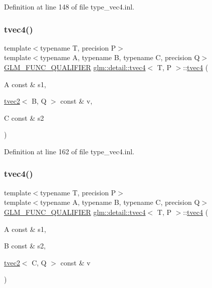 Definition at line 148 of file type\+\_\+vec4.\+inl.

\mbox{\label{structglm_1_1detail_1_1tvec4_ad501d232fe0d59f7734803371445a9cd}} 
\subsubsection{\texorpdfstring{tvec4()}{tvec4()}\hspace{0.1cm}{\footnotesize\ttfamily [19/23]}}
{\footnotesize\ttfamily template$<$typename T, precision P$>$ \\
template$<$typename A, typename B, typename C, precision Q$>$ \\
\hyperlink{setup_8hpp_a33fdea6f91c5f834105f7415e2a64407}{G\+L\+M\+\_\+\+F\+U\+N\+C\+\_\+\+Q\+U\+A\+L\+I\+F\+I\+ER} \hyperlink{structglm_1_1detail_1_1tvec4}{glm\+::detail\+::tvec4}$<$ T, P $>$\+::\hyperlink{structglm_1_1detail_1_1tvec4}{tvec4} (\begin{DoxyParamCaption}\item[{A const \&}]{s1,  }\item[{\hyperlink{structglm_1_1detail_1_1tvec2}{tvec2}$<$ B, Q $>$ const \&}]{v,  }\item[{C const \&}]{s2 }\end{DoxyParamCaption})}



Definition at line 162 of file type\+\_\+vec4.\+inl.

\mbox{\label{structglm_1_1detail_1_1tvec4_a5ba14812472c30b9d34fdafa413c1846}} 
\subsubsection{\texorpdfstring{tvec4()}{tvec4()}\hspace{0.1cm}{\footnotesize\ttfamily [20/23]}}
{\footnotesize\ttfamily template$<$typename T, precision P$>$ \\
template$<$typename A, typename B, typename C, precision Q$>$ \\
\hyperlink{setup_8hpp_a33fdea6f91c5f834105f7415e2a64407}{G\+L\+M\+\_\+\+F\+U\+N\+C\+\_\+\+Q\+U\+A\+L\+I\+F\+I\+ER} \hyperlink{structglm_1_1detail_1_1tvec4}{glm\+::detail\+::tvec4}$<$ T, P $>$\+::\hyperlink{structglm_1_1detail_1_1tvec4}{tvec4} (\begin{DoxyParamCaption}\item[{A const \&}]{s1,  }\item[{B const \&}]{s2,  }\item[{\hyperlink{structglm_1_1detail_1_1tvec2}{tvec2}$<$ C, Q $>$ const \&}]{v }\end{DoxyParamCaption})}



